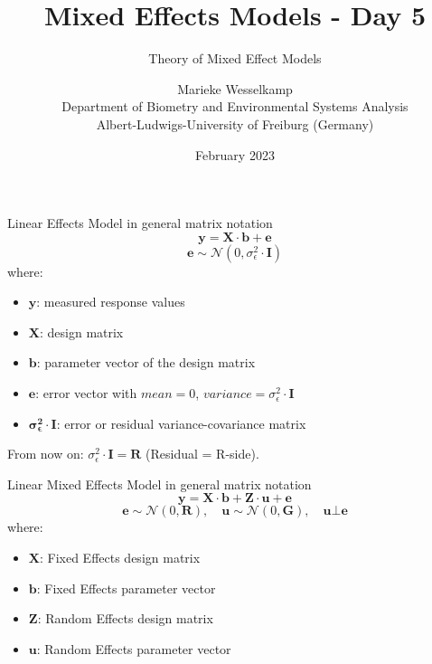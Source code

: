 \documentclass{beamer}
\title{Mixed Effects Models - Day 5}
\subtitle{Theory of Mixed Effect Models}
\author{Marieke Wesselkamp \\ Department of Biometry and Environmental Systems Analysis \\
Albert-Ludwigs-University of Freiburg (Germany)}
\date{February 2023}
\begin{document}
\frame{\titlepage}


\begin{frame}{Linear Effects Model in general matrix notation}
\[
\mathbf{y} = \mathbf{X} \cdot \mathbf{b} + \mathbf{e}
\]
\[
\mathbf{e} \sim \mathcal{N}(0, \sigma^2_{\epsilon} \cdot \mathbf{I})
\]
where:
\begin{itemize}
  \item $\mathbf{y}$: measured response values
  \item $\mathbf{X}$: design matrix
  \item $\mathbf{b}$: parameter vector of the design matrix
  \item $\mathbf{e}$: error vector with $mean = 0$, $variance = \sigma^2_{\epsilon} \cdot \mathbf{I}$
  \item $\mathbf{\sigma^2_{\epsilon} \cdot \mathbf{I}}$: error or residual variance-covariance matrix
\end{itemize}
\vspace{0.5cm}

From now on: $\sigma^2_{\epsilon} \cdot \mathbf{I} = \mathbf{R}$ (Residual = R-side).
\end{frame}

\begin{frame}{Linear Mixed Effects Model in general matrix notation}
\[
\mathbf{y} = \mathbf{X} \cdot \mathbf{b} + \mathbf{Z} \cdot \mathbf{u} + \mathbf{e}
\]
\[
\mathbf{e} \sim \mathcal{N}(0, \mathbf{R}), \quad \mathbf{u} \sim \mathcal{N}(0, \mathbf{G}), \quad \mathbf{u} \bot \mathbf{e}
\]
where:
\begin{itemize}
  \item $\mathbf{X}$: Fixed Effects design matrix
  \item $\mathbf{b}$: Fixed Effects parameter vector
  \item $\mathbf{Z}$: Random Effects design matrix
  \item $\mathbf{u}$: Random Effects parameter vector
\end{itemize}
\end{frame}
\end{document}
